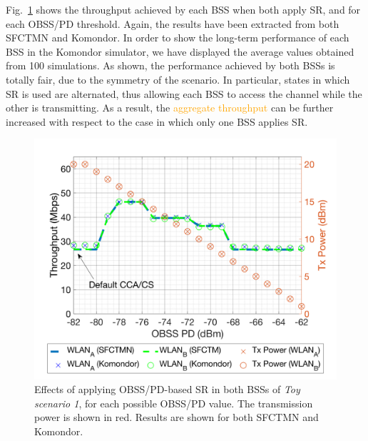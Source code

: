\documentclass{ieeeaccess}
\begin{document}

Fig.~\ref{fig:toy_scenario_1c_results} shows the throughput achieved by each BSS when both apply SR, and for each OBSS/PD threshold. Again, the results have been extracted from both SFCTMN and Komondor. In order to show the long-term performance of each BSS in the Komondor simulator, we have displayed the average values obtained from 100 simulations. As shown, the performance achieved by both BSSs is totally fair, due to the symmetry of the scenario. In particular, states in which SR is used are alternated, thus allowing each BSS to access the channel while the other is transmitting. As a result, the \textcolor{orange}{aggregate throughput} can be further increased with respect to the case in which only one BSS applies SR. %

\begin{figure}[ht!]
	\centering
	\includegraphics[width=\columnwidth]{SIM_1_1b}
	\caption{Effects of applying OBSS/PD-based SR in both BSSs of \emph{Toy scenario 1}, for each possible OBSS/PD value. The transmission power is shown in red. Results are shown for both SFCTMN and Komondor.}		
	\label{fig:toy_scenario_1c_results}
\end{figure}
\end{document}
